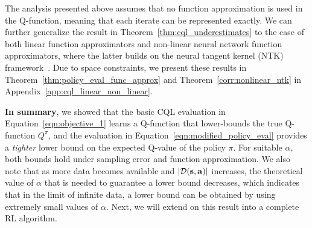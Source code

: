 The analysis presented above assumes that no function approximation is used in the Q-function, meaning that each iterate can be represented exactly.
We can further generalize the result in Theorem~\ref{thm:cql_underestimates} to the case of both linear function approximators and non-linear neural network function approximators, where the latter builds on the neural tangent kernel (NTK) framework~\citep{ntk}. Due to space constraints, we present these results in Theorem~\ref{thm:policy_eval_func_approx} and Theorem~\ref{corr:nonlinear_ntk} in Appendix~\ref{app:cql_linear_non_linear}. 

\textbf{In summary}, we showed that the basic CQL evaluation in Equation~\ref{eqn:objective_1} learns a Q-function that lower-bounds the true Q-function $Q^\pi$, and the evaluation in Equation~\ref{eqn:modified_policy_eval} provides a \emph{tighter} lower bound on the expected Q-value of the policy $\pi$. For suitable $\alpha$, both bounds hold under sampling error and function approximation. {We also note that as more data becomes available and $|\mathcal{D}(\mathbf{s}, \mathbf{a})|$ increases, the theoretical value of $\alpha$ that is needed to guarantee a lower bound decreases, which indicates that in the limit of infinite data, a lower bound can be obtained by using extremely small values of $\alpha$.} Next, we will extend on this result into a complete RL algorithm.




